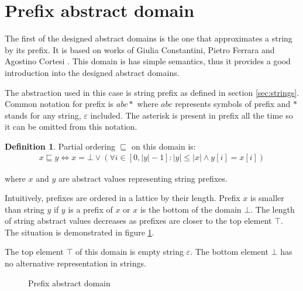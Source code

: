 \documentclass[12pt,final,oneside]{fithesis2}
\theoremstyle{definition}
\newtheorem{definition}{Definition}[chapter]
\begin{document}
\section{Prefix abstract domain}

The first of the designed abstract domains is the one that approximates
a string by its prefix. It is based on works of Giulia Constantini,
Pietro Ferrara and Agostino Cortesi \cite{Constantini11-1}. This domain
is has simple semantics, thus it provides a good introduction into the
designed abstract domains.

The abstraction used in this case is string prefix as defined in section
\ref{sec:strings}. Common notation for prefix is $abc*$ where $abc$
represents symbols of prefix and $*$ stands for any string, $\varepsilon$
included. The asterisk is present in prefix all the time so it can be
omitted from this notation.

\begin{definition}
Partial ordering $\sqsubseteq$ on this domain is:
\begin{align*}
x \sqsubseteq y \Leftrightarrow
  x = \bot \lor (\forall i \in [0, |y| - 1] :
  |y| \leq |x| \land y[i] = x[i])
\end{align*}

where $x$ and $y$ are abstract values representing string prefixes.
\end{definition}

Intuitively, prefixes are ordered in a lattice by their length. Prefix
$x$ is smaller than string $y$ if $y$ is a
prefix of $x$ or $x$ is the bottom of the domain $\bot$.
The length of string abstract values decreases as prefixes are closer to
the top element $\top$. The situation is demonstrated in figure
\ref{fig:prefixlattice}.

The top element $\top$ of this domain is empty string $\varepsilon$. The bottom
element $\bot$ has no alternative representation in strings.

\begin{figure}[ht]
\centering
{}
\caption{Prefix abstract domain}
\label{fig:prefixlattice}
\end{figure}
\end{document}
